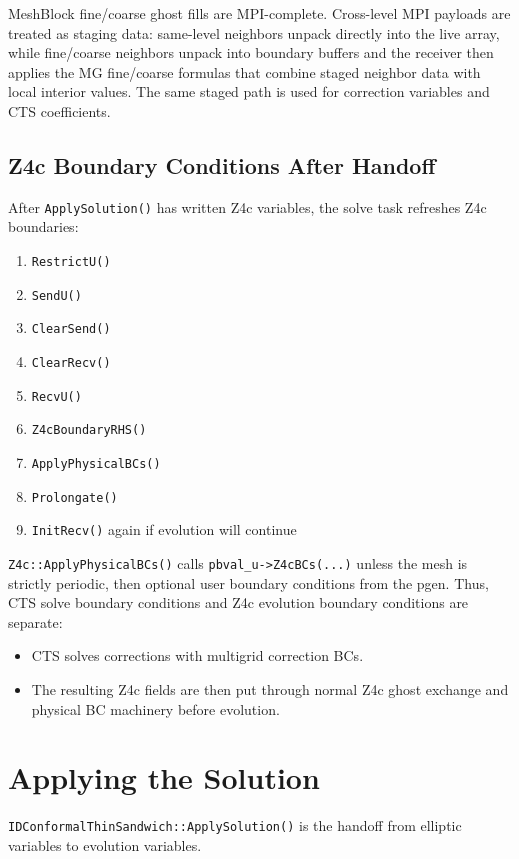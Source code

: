 \documentclass[11pt]{article}
\newcommand{\code}[1]{\texttt{#1}}
\begin{document}
MeshBlock fine/coarse ghost fills are MPI-complete.  Cross-level MPI payloads
are treated as staging data: same-level neighbors unpack directly into the live
array, while fine/coarse neighbors unpack into boundary buffers and the receiver
then applies the MG fine/coarse formulas that combine staged neighbor data with
local interior values.  The same staged path is used for correction variables
and CTS coefficients.

\subsection{Z4c Boundary Conditions After Handoff}

After \code{ApplySolution()} has written Z4c variables, the solve task refreshes
Z4c boundaries:
\begin{enumerate}
  \item \code{RestrictU()}
  \item \code{SendU()}
  \item \code{ClearSend()}
  \item \code{ClearRecv()}
  \item \code{RecvU()}
  \item \code{Z4cBoundaryRHS()}
  \item \code{ApplyPhysicalBCs()}
  \item \code{Prolongate()}
  \item \code{InitRecv()} again if evolution will continue
\end{enumerate}

\code{Z4c::ApplyPhysicalBCs()} calls \code{pbval\_u->Z4cBCs(...)} unless the mesh
is strictly periodic, then optional user boundary conditions from the pgen.
Thus, CTS solve boundary conditions and Z4c evolution boundary conditions are
separate:
\begin{itemize}
  \item CTS solves corrections with multigrid correction BCs.
  \item The resulting Z4c fields are then put through normal Z4c ghost exchange
        and physical BC machinery before evolution.
\end{itemize}

\section{Applying the Solution}

\code{IDConformalThinSandwich::ApplySolution()} is the handoff from elliptic
variables to evolution variables.
\end{document}
